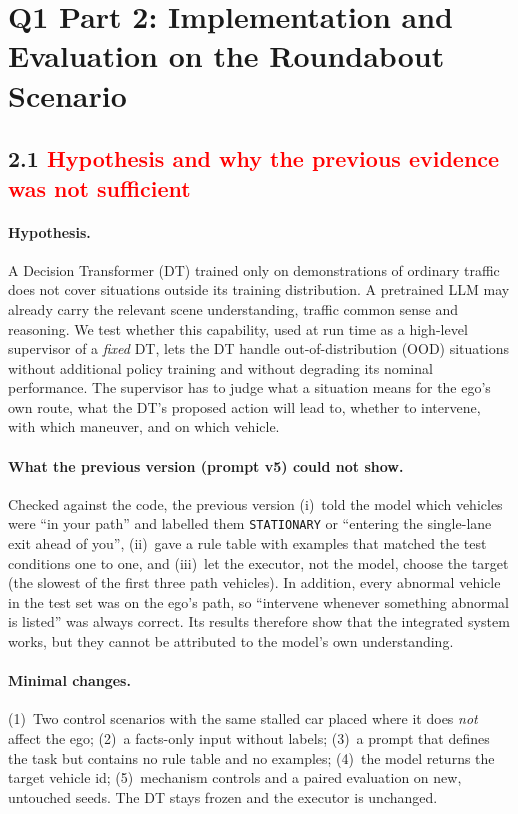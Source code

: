 \documentclass[11pt]{article}
\newcommand{\rev}[1]{\textcolor{red}{#1}}
\newenvironment{revblock}{\color{red}}{}
\begin{document}
\section*{Q1 Part 2: Implementation and Evaluation on the Roundabout Scenario}

\subsection*{2.1 \rev{Hypothesis and why the previous evidence was not sufficient}}

\begin{revblock}
\paragraph{Hypothesis.} A Decision Transformer (DT) trained only on demonstrations of ordinary traffic does not cover
situations outside its training distribution. A pretrained LLM may already carry the relevant scene understanding,
traffic common sense and reasoning. We test whether this capability, used at run time as a high-level supervisor of a
\emph{fixed} DT, lets the DT handle out-of-distribution (OOD) situations without additional policy training and
without degrading its nominal performance. The supervisor has to judge what a situation means for the ego's own route,
what the DT's proposed action will lead to, whether to intervene, with which maneuver, and on which vehicle.

\paragraph{What the previous version (prompt v5) could not show.} Checked against the code, the previous version
(i)~told the model which vehicles were ``in your path'' and labelled them \texttt{STATIONARY} or ``entering the
single-lane exit ahead of you'', (ii)~gave a rule table with examples that matched the test conditions one to one,
and (iii)~let the executor, not the model, choose the target (the slowest of the first three path vehicles). In
addition, every abnormal vehicle in the test set was on the ego's path, so ``intervene whenever something abnormal is
listed'' was always correct. Its results therefore show that the integrated system works, but they cannot be
attributed to the model's own understanding.

\paragraph{Minimal changes.} (1)~Two control scenarios with the same stalled car placed where it does \emph{not}
affect the ego; (2)~a facts-only input without labels; (3)~a prompt that defines the task but contains no rule table
and no examples; (4)~the model returns the target vehicle id; (5)~mechanism controls and a paired evaluation on new,
untouched seeds. The DT stays frozen and the executor is unchanged.
\end{revblock}
\end{document}
